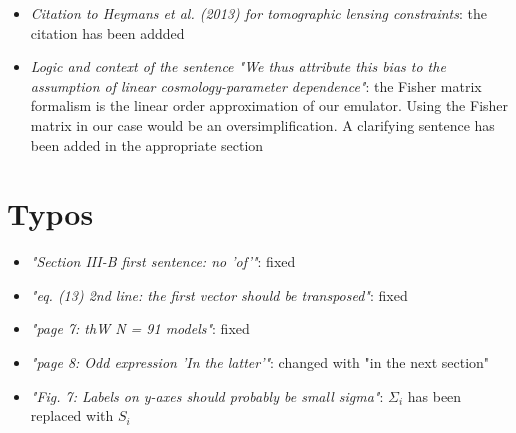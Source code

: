 \documentclass[11pt]{article}
\begin{document}
\begin{itemize}
\item \textit{Citation to Heymans et al. (2013) for tomographic lensing constraints}: the citation has been addded

\item \textit{Logic and context of the sentence "We thus attribute this bias to the assumption of linear cosmology-parameter dependence"}: the Fisher matrix formalism is the linear order approximation of our emulator. Using the Fisher matrix in our case would be an oversimplification. A clarifying sentence has been added in the appropriate section 

\end{itemize}

\section*{Typos}

\begin{itemize}
\item \textit{"Section III-B first sentence: no 'of'"}: fixed
\item \textit{"eq. (13) 2nd line: the first vector should be transposed"}: fixed
\item \textit{"page 7: thW N = 91 models"}: fixed
\item \textit{"page 8: Odd expression 'In the latter'"}: changed with "in the next section"
\item \textit{"Fig. 7: Labels on y-axes should probably be small sigma"}: $\Sigma_i$ has been replaced with $S_i$

\end{itemize}
     
\end{document}
